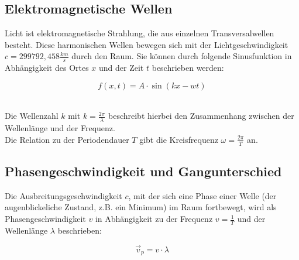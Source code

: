 \documentclass[12pt,a4paper,titlepage,headinclude,bibtotoc]{scrartcl}
\begin{document}
\subsection{Elektromagnetische Wellen}
Licht ist elektromagnetische Strahlung, die aus einzelnen Transversalwellen besteht. Diese harmonischen Wellen bewegen sich mit der Lichtgeschwindigkeit $c= 299 792,458 \frac{km}{s}$ durch den Raum. Sie können durch folgende Sinusfunktion in Abhängigkeit des Ortes $x$ und der Zeit $t$ beschrieben werden:
\\
\par %
\begin{equation}
f(x,t)={ A}\cdot{\sin(kx-wt)}
\end{equation}
\\
\par

Die Wellenzahl $k$ mit $k=\frac{2\pi}{\lambda}$ beschreibt hierbei den Zusammenhang zwischen der Wellenlänge und der Frequenz. \\
Die Relation zu der Periodendauer $T$ gibt die Kreisfrequenz $\omega =\frac{2\pi}{T} $ an.  








\subsection{Phasengeschwindigkeit und Gangunterschied}
Die Ausbreitungsgeschwindigkeit $c$, mit der sich eine Phase einer Welle (der augenblickeliche Zustand, z.B. ein Minimum) im Raum fortbewegt, wird als Phasengeschwindigkeit $v$ in Abhängigkeit zu der Frequenz $v=\frac{1}{T}$ und der Wellenlänge $\lambda$ beschrieben:\\
\par
\begin{equation}
\vec{v}_p = {v}\cdot{\lambda}
\end{equation}
\\
\par
\end{document}
